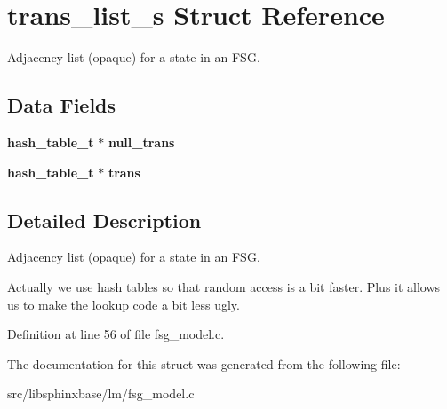 \section{trans\-\_\-list\-\_\-s Struct Reference}
\label{structtrans__list__s}


Adjacency list (opaque) for a state in an F\-S\-G.  


\subsection*{Data Fields}
\begin{DoxyCompactItemize}
\item 
{\bf hash\-\_\-table\-\_\-t} $\ast$ {\bfseries null\-\_\-trans}\label{structtrans__list__s_a15223c70915f916f5656627985c6fd39}

\item 
{\bf hash\-\_\-table\-\_\-t} $\ast$ {\bfseries trans}\label{structtrans__list__s_ade18f3313bc542cee585f0c5c16de96a}

\end{DoxyCompactItemize}


\subsection{Detailed Description}
Adjacency list (opaque) for a state in an F\-S\-G. 

Actually we use hash tables so that random access is a bit faster. Plus it allows us to make the lookup code a bit less ugly. 

Definition at line 56 of file fsg\-\_\-model.\-c.



The documentation for this struct was generated from the following file\-:\begin{DoxyCompactItemize}
\item 
src/libsphinxbase/lm/fsg\-\_\-model.\-c\end{DoxyCompactItemize}
